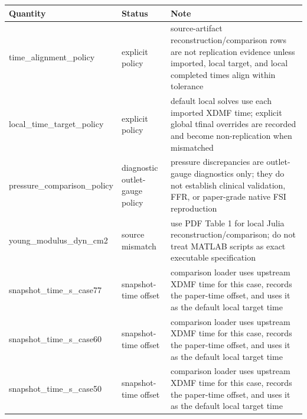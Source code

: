 \begin{tabular}{lll}
\toprule
Quantity & Status & Note \\
\midrule
time\_alignment\_policy & explicit policy & source-artifact reconstruction/comparison rows are not replication evidence unless imported, local target, and local completed times align within tolerance \\
local\_time\_target\_policy & explicit policy & default local solves use each imported XDMF time; explicit global tfinal overrides are recorded and become non-replication when mismatched \\
pressure\_comparison\_policy & diagnostic outlet-gauge policy & pressure discrepancies are outlet-gauge diagnostics only; they do not establish clinical validation, FFR, or paper-grade native FSI reproduction \\
young\_modulus\_dyn\_cm2 & source mismatch & use PDF Table 1 for local Julia reconstruction/comparison; do not treat MATLAB scripts as exact executable specification \\
snapshot\_time\_s\_case77 & snapshot-time offset & comparison loader uses upstream XDMF time for this case, records the paper-time offset, and uses it as the default local target time \\
snapshot\_time\_s\_case60 & snapshot-time offset & comparison loader uses upstream XDMF time for this case, records the paper-time offset, and uses it as the default local target time \\
snapshot\_time\_s\_case50 & snapshot-time offset & comparison loader uses upstream XDMF time for this case, records the paper-time offset, and uses it as the default local target time \\
\bottomrule
\end{tabular}
